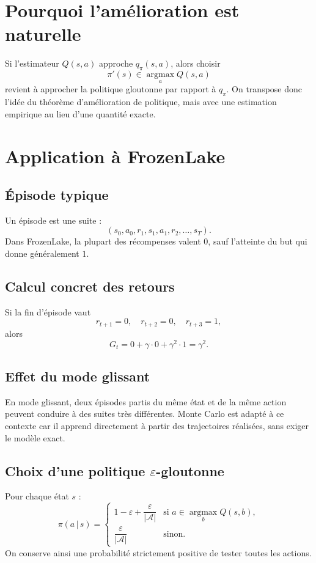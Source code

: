 \documentclass[11pt,a4paper]{article}
\newcommand{\argmax}{\operatorname*{argmax}}
\newcommand{\given}{\,|\,}
\begin{document}
\section{Pourquoi l'amélioration est naturelle}

Si l'estimateur $Q(s,a)$ approche $q_{\pi}(s,a)$, alors choisir
\[
\pi'(s)\in \argmax_a Q(s,a)
\]
revient à approcher la politique gloutonne par rapport à $q_{\pi}$. On transpose donc l'idée du théorème d'amélioration de politique, mais avec une estimation empirique au lieu d'une quantité exacte.

\section{Application à FrozenLake}

\subsection{Épisode typique}

Un épisode est une suite :
\[
(s_0,a_0,r_1,s_1,a_1,r_2,\dots,s_T).
\]
Dans FrozenLake, la plupart des récompenses valent $0$, sauf l'atteinte du but qui donne généralement $1$.

\subsection{Calcul concret des retours}

Si la fin d'épisode vaut
\[
r_{t+1}=0,\quad r_{t+2}=0,\quad r_{t+3}=1,
\]
alors
\[
G_t = 0 + \gamma\cdot 0 + \gamma^2 \cdot 1 = \gamma^2.
\]

\subsection{Effet du mode glissant}

En mode glissant, deux épisodes partis du même état et de la même action peuvent conduire à des suites très différentes. Monte Carlo est adapté à ce contexte car il apprend directement à partir des trajectoires réalisées, sans exiger le modèle exact.

\subsection{Choix d'une politique $\varepsilon$-gloutonne}

Pour chaque état $s$ :
\[
\pi(a\given s)=
\begin{cases}
1-\varepsilon+\dfrac{\varepsilon}{|\mathcal A|} & \text{si } a \in \argmax_b Q(s,b),\\[0.8em]
\dfrac{\varepsilon}{|\mathcal A|} & \text{sinon.}
\end{cases}
\]
On conserve ainsi une probabilité strictement positive de tester toutes les actions.
\end{document}

